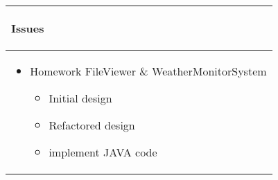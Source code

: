 \documentclass{article}
\begin{document}
\begin{longtable}{|p{\textwidth}|}
\hline
\rowcolor{background}
\begin{center}
\vspace{-1.5em}\textbf{Issues}\vspace{-1em}
\end{center} \\
\hline
\endhead
\begin{itemize}
    \item Homework FileViewer \& WeatherMonitorSystem
    \begin{itemize}
        \item Initial design
        \item Refactored design
        \item implement JAVA code
    \end{itemize}
    \begin{center}
    \end{center}
\end{itemize}\\
\hline
\end{longtable}
\end{document}
